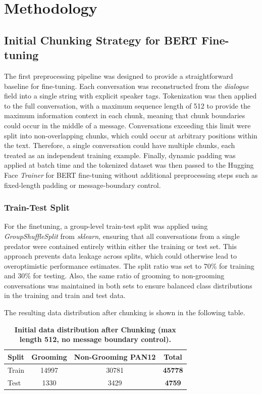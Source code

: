 \chapter{Methodology} \label{sec:methodology}


\section{Initial Chunking Strategy for BERT Fine-tuning}

The first preprocessing pipeline was designed to provide a straightforward baseline for fine-tuning. Each conversation was reconstructed from the \textit{dialogue} field into a single string with explicit speaker tags. Tokenization was then applied to the full conversation, with a maximum sequence length of 512 to provide the maximum information context in each chunk, meaning that chunk boundaries could occur in the middle of a message. Conversations exceeding this limit were split into non-overlapping chunks, which could occur at arbitrary positions within the text. Therefore, a single conversation could have multiple chunks, each treated as an independent training example. Finally, dynamic padding was applied at batch time and the tokenized dataset was then passed to the Hugging Face \textit{Trainer} for BERT fine-tuning without additional preprocessing steps such as fixed-length padding or message-boundary control.

\subsection{Train-Test Split}
For the finetuning, a group-level train-test split was applied using \textit{GroupShuffleSplit} from \textit{sklearn}, ensuring that all conversations from a single predator were contained entirely within either the training or test set. This approach prevents data leakage across splits, which could otherwise lead to overoptimistic performance estimates. The split ratio was set to 70\% for training and 30\% for testing. Also, the same ratio of grooming to non-grooming conversations was maintained in both sets to ensure balanced class distributions in the training and train and test data.

The resulting data distribution after chunking is shown in the following table.

\begin{table}[H] 
\label{tab:initial_split} 
\centering
\small
\caption[Initial data distribution after chunking]{\textbf{Initial data distribution after Chunking (max length 512, no message boundary control).}}
\begin{tabular}{lccc}
\hline
Split & Grooming & Non-Grooming PAN12  & \textbf{Total} \\
\hline
Train & 14997 & 30781  & \textbf{45778} \\
Test  & 1330 & 3429   & \textbf{4759} \\
\end{tabular}
\end{table}

